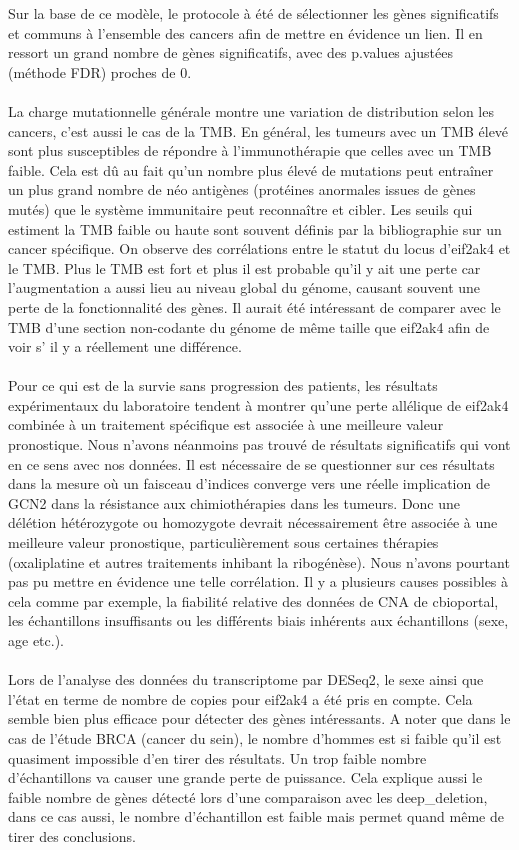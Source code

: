 \documentclass{style}
\begin{document}
Sur la base de ce modèle, le protocole à été de sélectionner les gènes significatifs et communs à l’ensemble des cancers afin de mettre en évidence un lien. Il en ressort un grand nombre de gènes significatifs, avec des p.values ajustées (méthode FDR) proches de 0. \\ \\
La charge mutationnelle générale montre une variation de distribution selon les cancers, c’est aussi le cas de la TMB. En général, les tumeurs avec un TMB élevé sont plus susceptibles de répondre à l'immunothérapie que celles avec un TMB faible. Cela est dû au fait qu'un nombre plus élevé de mutations peut entraîner un plus grand nombre de néo antigènes (protéines anormales issues de gènes mutés) que le système immunitaire peut reconnaître et cibler. Les seuils qui estiment la TMB faible ou haute sont souvent définis par la bibliographie sur un cancer spécifique. On observe des corrélations entre le statut du locus d’eif2ak4 et le TMB. Plus le TMB est fort et plus il est probable qu’il y ait une perte car l’augmentation a aussi lieu au niveau global du génome, causant souvent une perte de la fonctionnalité des gènes. Il aurait été intéressant de comparer avec le TMB d’une section non-codante du génome de même taille que eif2ak4 afin de voir s' il y a réellement une différence. \\ \\
Pour ce qui est de la survie sans progression des patients, les résultats expérimentaux du laboratoire tendent à montrer qu’une perte allélique de eif2ak4 combinée à un traitement spécifique est associée à une meilleure valeur pronostique. Nous n’avons néanmoins pas trouvé de résultats significatifs qui vont en ce sens avec nos données. Il est nécessaire de se questionner sur ces résultats dans la mesure où un faisceau d’indices converge vers une réelle implication de GCN2 dans la résistance aux chimiothérapies dans les tumeurs. Donc une délétion hétérozygote ou homozygote devrait nécessairement être associée à une meilleure valeur pronostique, particulièrement sous certaines thérapies (oxaliplatine et autres traitements inhibant la ribogénèse). Nous n’avons pourtant pas pu mettre en évidence une telle corrélation. Il y a plusieurs causes possibles à cela comme par exemple, la fiabilité relative des données de CNA de cbioportal, les échantillons insuffisants ou les différents biais inhérents aux échantillons (sexe, age etc.). \\ \\
Lors de l’analyse des données du transcriptome par DESeq2, le sexe ainsi que l’état en terme de nombre de copies pour eif2ak4 a été pris en compte. Cela semble bien plus efficace pour détecter des gènes intéressants. A noter que dans le cas de l’étude BRCA (cancer du sein), le nombre d'hommes est si faible qu’il est quasiment impossible d’en tirer des résultats. Un trop faible nombre d'échantillons va causer une grande perte de puissance. Cela explique aussi le faible nombre de gènes détecté lors d’une comparaison avec les deep\_deletion, dans ce cas aussi, le nombre d’échantillon est faible mais permet quand même de tirer des conclusions. \\
\end{document}
